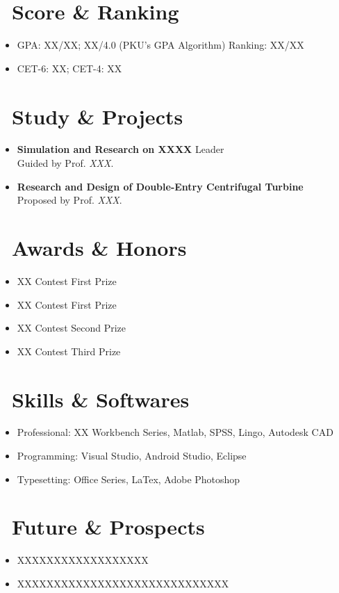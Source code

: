 \documentclass{resume}
\begin{document}
\normalsize{
\section{\faCheckCircle\ Score \& Ranking}
\begin{itemize}
\item GPA: XX/XX; XX/4.0 (PKU's GPA Algorithm) \hfill Ranking: XX/XX
\item CET-6: XX; CET-4: XX
\end{itemize}


\section{\faFlask\ Study \& Projects}
\begin{itemize}
\item \textbf{Simulation and Research on XXXX} \hfill Leader\\
Guided by Prof. \emph{XXX}. \\
\emph{\lipsum[3]}

\item \textbf{Research and Design of Double-Entry Centrifugal Turbine} \\
Proposed by Prof. \emph{XXX}. \\
\emph{\lipsum[4]}

\end{itemize}

\section{\faStar\ Awards \& Honors}
\begin{itemize}
\item XX Contest \hfill First Prize
\item XX Contest \hfill First Prize
\item XX Contest \hfill Second Prize
\item XX Contest  \hfill Third Prize
\end{itemize}

\section{\faCogs\ Skills \& Softwares}
\begin{itemize}
\item Professional: XX Workbench Series, Matlab, SPSS, Lingo, Autodesk CAD
\item Programming: Visual Studio, Android Studio, Eclipse
\item Typesetting: Office Series, LaTex, Adobe Photoshop
\end{itemize}

\section{\faMapSigns\ Future \& Prospects}
\begin{itemize}
\item XXXXXXXXXXXXXXXXXX
\item XXXXXXXXXXXXXXXXXXXXXXXXXXXXX
\end{itemize}

}
\end{document}
